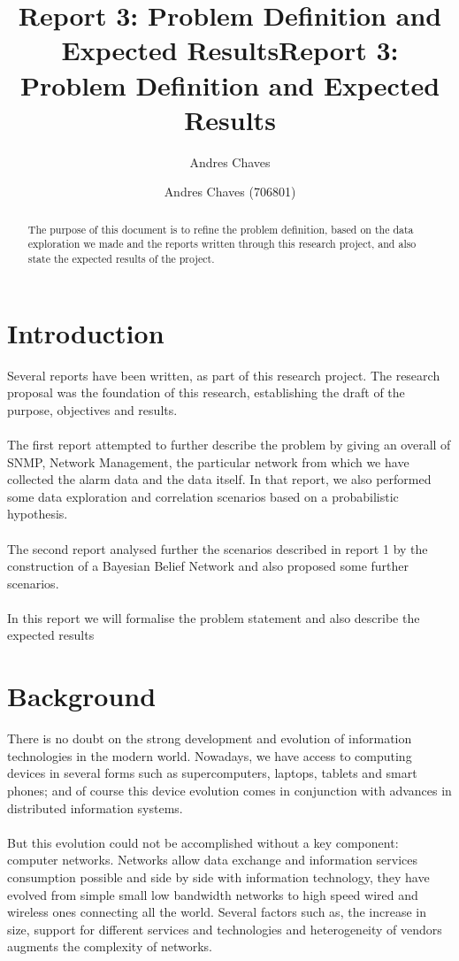 \documentclass[10pt,a4paper]{article}
\author{Andres Chaves}
\title{Report 3: Problem Definition and Expected Results}
\begin{document}
 \title{Report 3: Problem Definition and Expected Results}
 \author{Andres Chaves (706801) \\
  }
 \maketitle


 \begin{abstract}
    The purpose of this document is to refine the problem definition, based on the data exploration we made and the reports written through this research project, and also state the expected results of the project.
\end{abstract}

 \section*{Introduction}
Several reports have been written, as part of this research project. The research proposal was the foundation of this research, establishing the draft of the purpose, objectives and results.
\\\\
The first report attempted to further describe the problem by giving an overall of SNMP, Network Management, the particular network from which we have collected the alarm data and the data itself. In that report, we also performed some data exploration and correlation scenarios based on a probabilistic hypothesis.
\\\\
The second report analysed further the scenarios described in report 1 by the construction of a Bayesian Belief Network and also proposed some further scenarios.
\\\\
In this report we will formalise the problem statement and also describe the expected results

 \section{Background}
 There is no doubt on the strong development and evolution of information technologies in the modern world. Nowadays, we have access to computing devices in several forms such as supercomputers, laptops, tablets and smart phones; and of course this device evolution comes in conjunction with advances in distributed information systems.
 \\\\
 But this evolution could not be accomplished without a key component: computer networks. Networks allow data exchange and information services consumption possible and side by side with information technology, they have evolved from simple small low bandwidth networks to high speed wired and wireless ones connecting all the world. Several factors such as, the increase in size, support for different services and technologies and heterogeneity of vendors augments the complexity of networks\cite{autonomicComputing}.
\end{document}
